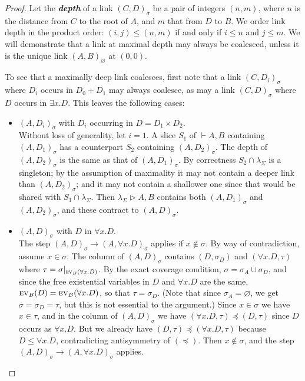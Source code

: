 \documentclass[UKenglish]{lipics-v2019}
\newcommand\defn[1]{\textit{\textbf{#1}}}
\newcommand\ex[2][{}]{\textsc{ev}_{#1}(#2)}
\newcommand\+{+}
\renewcommand\*{\times}
\newcommand\sub{\leq}
\newcommand\dep{\preccurlyeq}
\newcommand\seq[2]{{\vdash}#1,#2}
\newcommand\net[3]{#1\triangleright #2,#3}
\newcommand\res[1]{|_{#1}}
\newcommand\link[3][\sigma]{(#2,#3)_{#1}}
\newcommand\scoal{\rightarrow} %
\begin{document}
\begin{proof}
Let the \defn{depth} of a link $\link CD$ be a pair of integers $(n,m)$, where $n$ is the distance from $C$ to the root of $A$, and $m$ that from $D$ to $B$. We order link depth in the product order: $(i,j)\leq(n,m)$ if and only if $i\leq n$ and $j\leq m$. We will demonstrate that a link at maximal depth may always be coalesced, unless it is the unique link $\link[\varnothing]AB$ at $(0,0)$. 

To see that a maximally deep link coalesces, first note that a link $\link C{D_i}$ where $D_i$ occurs in $D_0{\+}D_1$ may always coalesce, as may a link $\link CD$ where $D$ occurs in $\exists x.D$. This leaves the following cases:
\begin{itemize}
	\item 
$\link A{D_i}$ with $D_i$ occurring in $D=D_1\*D_2$.
\\ 
Without loss of generality, let $i=1$. A slice $S_1$ of $\seq AB$ containing $\link A{D_1}$ has a counterpart $S_2$ containing $\link A{D_2}$. The depth of $\link A{D_2}$ is the same as that of $\link A{D_1}$. By correctness $S_2\cap \lambda_\Sigma$ is a singleton; by the assumption of maximality it may not contain a deeper link than $\link A{D_2}$; and it may not contain a shallower one since that would be shared with $S_1\cap\lambda_\Sigma$. Then $\net{\lambda_\Sigma}AB$ contains both $\link A{D_1}$ and $\link A{D_2}$, and these contract to $\link AD$.
	
	\item 
$\link AD$ with $D$ in $\forall x.D$. 
\\
The step $\link AD\scoal\link A{\forall x.D}$ applies if $x\notin\sigma$. By way of contradiction, assume $x\in\sigma$. The column of $\link AD$ contains $(D,\sigma_D)$ and $(\forall x.D,\tau)$ where $\tau=\sigma\res{\ex[B]{\forall x.D}}$. By the exact coverage condition, $\sigma=\sigma_A\cup\sigma_D$, and since the free existential variables in $D$ and $\forall x.D$ are the same, $\ex[B]D=\ex[B]{\forall x.D}$, so that $\tau=\sigma_D$. (Note that since $\sigma_A=\varnothing$, we get $\sigma=\sigma_D=\tau$, but this is not essential to the argument.) Since $x\in\sigma$ we have $x\in\tau$, and in the column of $\link AD$ we have $(\forall x.D,\tau)\dep(D,\tau)$ since $D$ occurs as $\forall x.D$. But we already have $(D,\tau)\dep(\forall x.D,\tau)$ because $D\sub\forall x.D$, contradicting antisymmetry of $(\dep)$. Then $x\notin\sigma$, and the step $\link AD\scoal\link A{\forall x.D}$ applies.


\end{itemize}
\end{proof}
\end{document}
